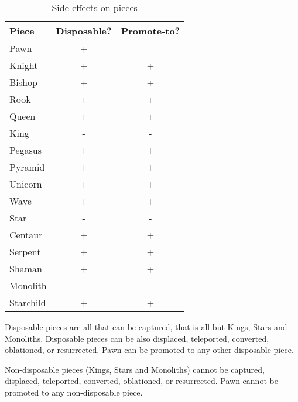 \begin{table}[!h]
\centering
\begin{tabular}{ lcc }
\toprule
\textbf{Piece} & \textbf{Disposable?} & \textbf{Promote-to?}  \\
\midrule
Pawn           & +                    & -                     \\
Knight         & +                    & +                     \\
Bishop         & +                    & +                     \\
Rook           & +                    & +                     \\
Queen          & +                    & +                     \\
King           & -                    & -                     \\ \cmidrule{1-3}
Pegasus        & +                    & +                     \\
Pyramid        & +                    & +                     \\
Unicorn        & +                    & +                     \\
Wave           & +                    & +                     \\
Star           & -                    & -                     \\
Centaur        & +                    & +                     \\
Serpent        & +                    & +                     \\
Shaman         & +                    & +                     \\
Monolith       & -                    & -                     \\
Starchild      & +                    & +                     \\
\bottomrule
\end{tabular}
\caption{Side-effects on pieces}
\label{tbl:Appendix/Summary/Side-effects/Side-effects on pieces}
\end{table}

Disposable pieces are all that can be captured, that is all but Kings, Stars and Monoliths.
Disposable pieces can be also displaced, teleported, converted, oblationed, or resurrected.
Pawn can be promoted to any other disposable piece.

Non-disposable pieces (Kings, Stars and Monoliths) cannot be captured, displaced,
teleported, converted, oblationed, or resurrected. Pawn cannot be promoted to
any non-disposable piece.

